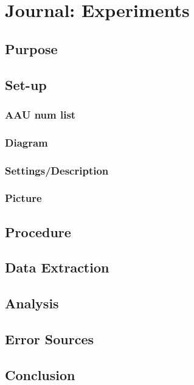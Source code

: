 
\section{Journal: Experiments}

\subsection{Purpose}

\subsection{Set-up}
\subsubsection{AAU num list}
\subsubsection{Diagram}
\subsubsection{Settings/Description}
\subsubsection{Picture}

\subsection{Procedure}

\subsection{Data Extraction}

\subsection{Analysis}

\subsection{Error Sources}

\subsection{Conclusion}